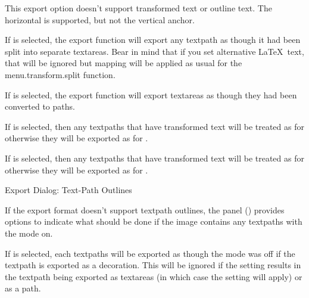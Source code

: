 This export option doesn't support transformed text or outline text.
The horizontal  is supported, but not the vertical
anchor.


If  is selected, the export function
will export any \gls{textpath} as though it had been split into
separate \glspl{textarea}. Bear in mind that if you set alternative
\LaTeX\ text, that will be ignored but mapping will be applied as
usual for the \gls{menu.transform.split} function.


If  is selected, the export function
will export \glspl{textarea} as though they had been converted to
paths.


If  is selected, then 
any \glspl{textpath} that have transformed text will be treated as
for  otherwise they will be exported
as for .


If  is selected, then 
any \glspl{textpath} that have transformed text will be treated as
for  otherwise they will be exported
as for .


 {}
 {Export Dialog: Text-Path Outlines}

If the export format doesn't support \gls{textpath} outlines, the
 panel
() provides options to
indicate what should be done if the image contains any
\glspl{textpath} with the  mode on.


If  is selected, each
\glspl{textpath} will be exported as though the  mode
was off if the \gls{textpath} is exported as a decoration.
This will be ignored if the  setting results in
the \gls{textpath} being exported as \glspl{textarea} (in which case
the  setting will apply) or as
a path.

